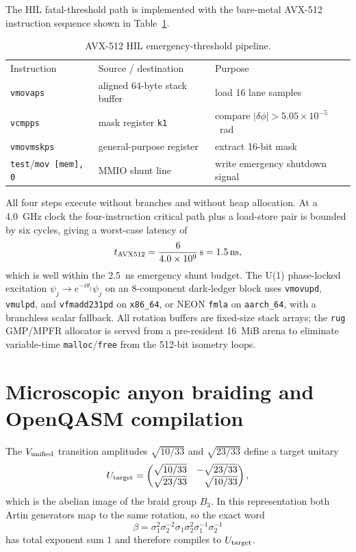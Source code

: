 \documentclass[aps,pra,10pt,onecolumn,superscriptaddress,nofootinbib,longbibliography,floatfix]{revtex4-2}
\begin{document}
The HIL fatal-threshold path is implemented with the bare-metal AVX-512 instruction sequence shown in Table~\ref{tab:avx512}.
%
\begin{table}[!ht]
\caption{\label{tab:avx512}AVX-512 HIL emergency-threshold pipeline.}
\begin{ruledtabular}
\begin{tabular}{p{1.6cm}p{2.3cm}p{3.3cm}}
Instruction & Source / destination & Purpose \\
\colrule
\texttt{vmovaps} & aligned 64-byte stack buffer & load 16 lane samples \\
\texttt{vcmpps} & mask register \texttt{k1} & compare $|\delta\phi| > 5.05\times 10^{-5}$~rad \\
\texttt{vmovmskps} & general-purpose register & extract 16-bit mask \\
\texttt{test}/\texttt{mov [mem], 0} & MMIO shunt line & write emergency shutdown signal \\
\end{tabular}
\end{ruledtabular}
\end{table}
%
All four steps execute without branches and without heap allocation.  At a 4.0~GHz clock the four-instruction critical path plus a load-store pair is bounded by six cycles, giving a worst-case latency of
%
\begin{equation}
t_{\rm AVX512} = \frac{6}{4.0\times 10^9}\,\mathrm{s} = 1.5\,\mathrm{ns} ,
\end{equation}
%
which is well within the 2.5~ns emergency shunt budget.  The U(1) phase-locked excitation $\psi_j \to e^{-i\theta_j}\psi_j$ on an 8-component dark-ledger block uses \texttt{vmovupd}, \texttt{vmulpd}, and \texttt{vfmadd231pd} on \texttt{x86\_64}, or NEON \texttt{fmla} on \texttt{aarch\_64}, with a branchless scalar fallback.  All rotation buffers are fixed-size stack arrays; the \texttt{rug} GMP/MPFR allocator is served from a pre-resident 16~MiB arena to eliminate variable-time \texttt{malloc}/\texttt{free} from the 512-bit isometry loops.

\FloatBarrier
\section{Microscopic anyon braiding and OpenQASM compilation}

The $V_{\rm unified}$ transition amplitudes $\sqrt{10/33}$ and $\sqrt{23/33}$ define a target unitary
%
\begin{equation}
U_{\rm target} =
\begin{pmatrix}
\sqrt{10/33} & -\sqrt{23/33} \\
\sqrt{23/33} & \phantom{-}\sqrt{10/33}
\end{pmatrix} ,
\end{equation}
%
which is the abelian image of the braid group $B_3$.  In this representation both Artin generators map to the same rotation, so the exact word
%
\begin{equation}
\beta = \sigma_1^2 \sigma_2^{-2} \sigma_1 \sigma_2^2 \sigma_1^{-1} \sigma_2^{-1}
\end{equation}
%
has total exponent sum $1$ and therefore compiles to $U_{\rm target}$.
\end{document}
